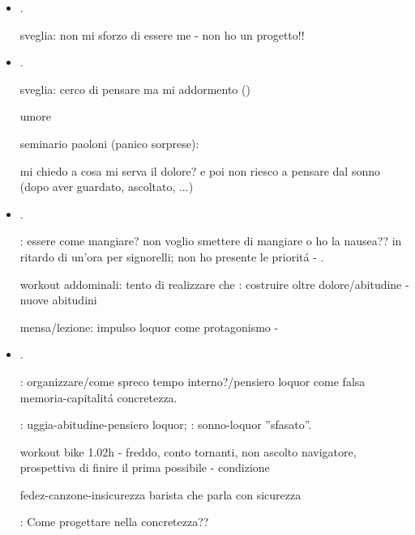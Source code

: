 \begin{itemize}
: ascoltare vs essere me

workout situp:

sforzo lucidit\'a loquor minaccia: !!

\item {}.

sveglia: non mi sforzo di essere me - non ho un progetto!!



\item {}.

sveglia: cerco di pensare ma mi addormento ()

umore

seminario paoloni (panico sorprese): 

mi chiedo a cosa mi serva il dolore?
e poi non riesco a pensare dal sonno (dopo aver guardato, ascoltato, ...)

\item {}.

: essere come mangiare? non voglio smettere di mangiare o ho la nausea??
in ritardo di un'ora per  signorelli; non ho presente le priorit\'a - .

workout addominali: tento di realizzare che : costruire oltre dolore/abitudine - nuove abitudini

mensa/lezione: impulso loquor come protagonismo - 

\item {}.

: organizzare/come spreco tempo interno?/pensiero loquor come falsa memoria-capitalit\'a concretezza.

: uggia-abitudine-pensiero loquor; : sonno-loquor ''sfasato''.

workout bike 1.02h - freddo, conto tornanti, non ascolto navigatore, prospettiva di finire il prima possibile - condizione 

fedez-canzone-insicurezza barista che parla con sicurezza 

: Come progettare nella concretezza??


\end{itemize}
